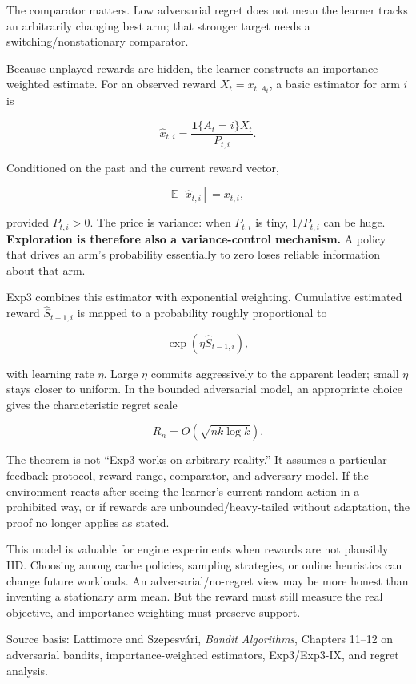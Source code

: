 The comparator matters. Low adversarial regret does not mean the learner tracks an arbitrarily changing best arm; that stronger target needs a switching/nonstationary comparator.

Because unplayed rewards are hidden, the learner constructs an importance-weighted estimate. For an observed reward \(X_t=x_{t,A_t}\), a basic estimator for arm \(i\) is

\[
\hat x_{t,i}
=
\frac{\mathbf 1\{A_t=i\}X_t}{P_{t,i}}.
\]

Conditioned on the past and the current reward vector,

\[
\mathbb E[\hat x_{t,i}]
=
x_{t,i},
\]

provided \(P_{t,i}>0\). The price is variance: when \(P_{t,i}\) is tiny, \(1/P_{t,i}\) can be huge. \textbf{Exploration is therefore also a variance-control mechanism.} A policy that drives an arm's probability essentially to zero loses reliable information about that arm.

Exp3 combines this estimator with exponential weighting. Cumulative estimated reward \(\hat S_{t-1,i}\) is mapped to a probability roughly proportional to

\[
\exp(\eta\hat S_{t-1,i}),
\]

with learning rate \(\eta\). Large \(\eta\) commits aggressively to the apparent leader; small \(\eta\) stays closer to uniform. In the bounded adversarial model, an appropriate choice gives the characteristic regret scale

\[
R_n=O(\sqrt{nk\log k}).
\]

The theorem is not ``Exp3 works on arbitrary reality.'' It assumes a particular feedback protocol, reward range, comparator, and adversary model. If the environment reacts after seeing the learner's current random action in a prohibited way, or if rewards are unbounded/heavy-tailed without adaptation, the proof no longer applies as stated.

This model is valuable for engine experiments when rewards are not plausibly IID. Choosing among cache policies, sampling strategies, or online heuristics can change future workloads. An adversarial/no-regret view may be more honest than inventing a stationary arm mean. But the reward must still measure the real objective, and importance weighting must preserve support.

Source basis: Lattimore and Szepesvári, \emph{Bandit Algorithms}, Chapters 11--12 on adversarial bandits, importance-weighted estimators, Exp3/Exp3-IX, and regret analysis.

